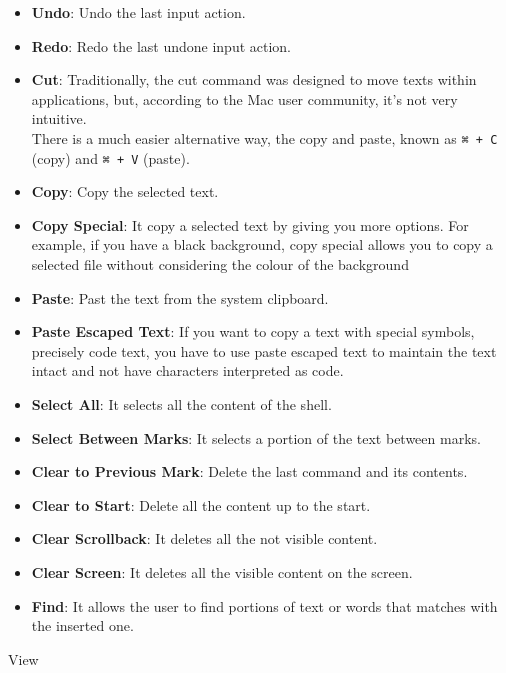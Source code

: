 \documentclass[hidelinks,12pt,a4paper,numbers=enddot]{scrartcl}
\begin{document}
\begin{itemize}
    \item \textbf{Undo}: Undo the last input action.
    \item \textbf{Redo}: Redo the last undone input action.
    \item \textbf{Cut}:
        Traditionally, the cut command was designed to move texts within applications, but,
        according to the Mac user community, it’s not very intuitive.\\
        There is a much easier alternative way, the copy and paste,
        known as \texttt{⌘ + C} (copy) and \texttt{⌘ + V} (paste).
    \item \textbf{Copy}: Copy the selected text.
    \item \textbf{Copy Special}:
        It copy a selected text by giving you more options.
        For example, if you have a black background, copy special allows you to copy a
        selected file without considering the colour of the background
    
    \item \textbf{Paste}: Past the text from the system clipboard.
    \item \textbf{Paste Escaped Text}:
        If you want to copy a text with special symbols, precisely code text,
        you have to use paste escaped text to maintain the text intact and not have characters
        interpreted as code.
    
    \item \textbf{Select All}: It selects all the content of the shell.
    \item \textbf{Select Between Marks}: It selects a portion of the text between marks.
    \item \textbf{Clear to Previous Mark}: Delete the last command and its contents.
    \item \textbf{Clear to Start}: Delete all the content up to the start.
    \item \textbf{Clear Scrollback}: It deletes all the not visible content.
    \item \textbf{Clear Screen}: It deletes all the visible content on the screen.
    \item \textbf{Find}:
        It allows the user to find portions of text or words that matches with the inserted one.
    
\end{itemize}

View
\end{document}
